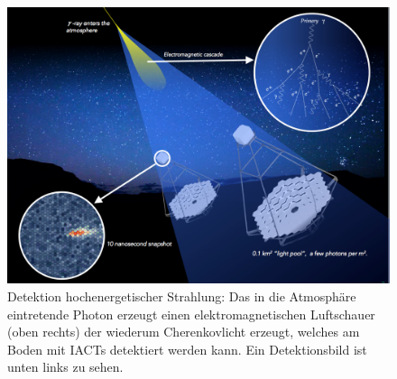 \begin{figure}[htbp]
\centering
\includegraphics[width=\textwidth]{Images/detection.png}
\caption{Detektion hochenergetischer Strahlung: Das in die Atmosphäre eintretende Photon erzeugt einen elektromagnetischen Luftschauer (oben rechts) der wiederum Cherenkovlicht erzeugt, welches am Boden mit IACTs detektiert werden kann. Ein Detektionsbild ist unten links zu sehen.\cite{Flickr}}
\label{img:detection}
\end{figure}
